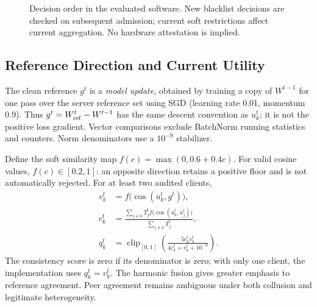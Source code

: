 \documentclass[conference,compsoc]{IEEEtran}
\newcommand{\clip}{\operatorname{clip}_{[0,1]}}
\begin{document}
\begin{figure}[t]
\centering
{}
\caption{Decision order in the evaluated software. New blacklist decisions are checked on subsequent admission; current soft restrictions affect current aggregation. No hardware attestation is implied.}
\label{fig:flow}
\end{figure}

\subsection{Reference Direction and Current Utility}
The clean reference $g^t$ is a \emph{model update}, obtained by training a copy of $W^{t-1}$ for one pass over the server reference set using SGD (learning rate 0.01, momentum 0.9). Thus $g^t=W_{\rm ref}^t-W^{t-1}$ has the same descent convention as $u_k^t$; it is not the positive loss gradient. Vector comparisons exclude BatchNorm running statistics and counters. Norm denominators use a $10^{-9}$ stabilizer.

Define the soft similarity map $f(c)=\max(0,0.6+0.4c)$. For valid cosine values, $f(c)\in[0.2,1]$: an opposite direction retains a positive floor and is not automatically rejected. For at least two audited clients,
\begin{align}
 v_k^t &= f\bigl(\cos(u_k^t,g^t)\bigr),\\
 c_k^t &= \frac{\sum_{j\ne k}T_j^t f\bigl(\cos(u_k^t,u_j^t)\bigr)}{\sum_{j\ne k}T_j^t},\\
 q_k^t &= \clip\!\left(\frac{5c_k^t v_k^t}{4c_k^t+v_k^t+10^{-9}}\right).
\end{align}
The consistency score is zero if its denominator is zero; with only one client, the implementation uses $q_k^t=v_k^t$. The harmonic fusion gives greater emphasis to reference agreement. Peer agreement remains ambiguous under both collusion and legitimate heterogeneity.
\end{document}
